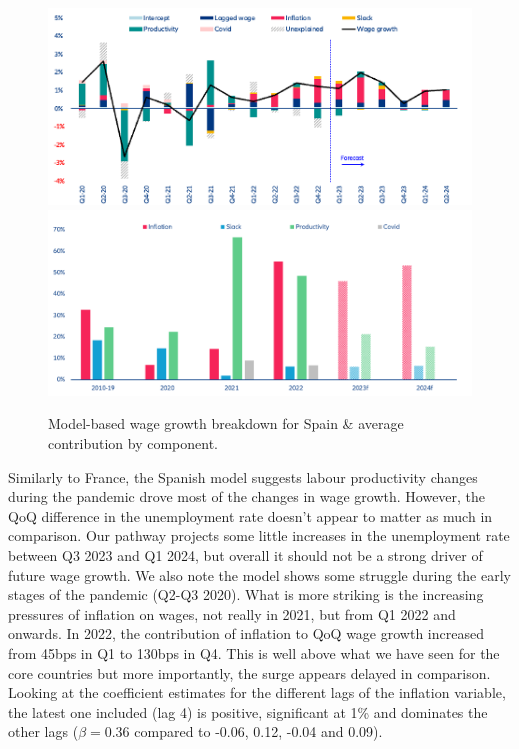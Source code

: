 \begin{figure}[H]
    \centering
    \caption{Model-based wage growth breakdown for Spain \& average contribution by component.}
    \includegraphics[width=.8\textwidth]{Core/2.Labour/img/spainb1.png}
    \includegraphics[width=.8\textwidth]{Core/2.Labour/img/spainb2.png}
    \label{figure:spbreakdown}
\end{figure}

Similarly to France, the Spanish model suggests labour productivity changes during the pandemic drove most of the changes in wage growth. 
However, the QoQ difference in the unemployment rate doesn’t appear to matter as much in comparison. 
Our pathway projects some little increases in the unemployment rate between Q3 2023 and Q1 2024, but overall it should not be a strong driver of future wage growth. 
We also note the model shows some struggle during the early stages of the pandemic (Q2-Q3 2020). 
What is more striking is the increasing pressures of inflation on wages, not really in 2021, but from Q1 2022 and onwards. 
In 2022, the contribution of inflation to QoQ wage growth increased from 45bps in Q1 to 130bps in Q4. 
This is well above what we have seen for the core countries but more importantly, the surge appears delayed in comparison. 
Looking at the coefficient estimates for the different lags of the inflation variable, the latest one included (lag 4) is positive, significant at 1\% and dominates the other lags ($\beta = 0.36$ compared to -0.06, 0.12, -0.04 and 0.09). 

